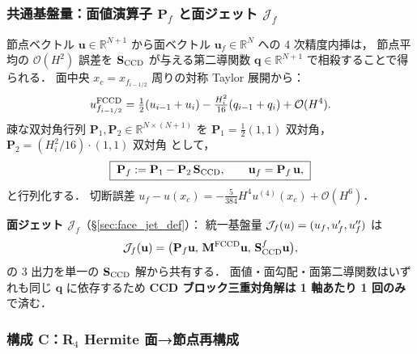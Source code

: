 \subsubsection{\texorpdfstring{共通基盤量：面値演算子 $\mathbf{P}_f$ と面ジェット $\mathcal{J}_f$}{共通基盤量：面値演算子 P\_f と面ジェット J\_f}}
\label{sec:fccd_adv_primitives}

節点ベクトル $\mathbf{u}\in\mathbb{R}^{N+1}$ から面ベクトル
$\mathbf{u}_f\in\mathbb{R}^N$ への 4 次精度内挿は，
節点平均の $\mathcal{O}(H^2)$ 誤差を $\mathbf{S}_{\mathrm{CCD}}$ が与える第二導関数
$\mathbf{q}\in\mathbb{R}^{N+1}$ で相殺することで得られる．
面中央 $x_c = x_{f_{i-1/2}}$ 周りの対称 Taylor 展開から：
\begin{equation}
  u^{\mathrm{FCCD}}_{f_{i-1/2}}
  = \tfrac{1}{2}(u_{i-1}+u_i)
  - \tfrac{H_i^2}{16}(q_{i-1}+q_i)
  + \mathcal{O}(H^4).
  \label{eq:fccd_adv_face_value}
\end{equation}
疎な双対角行列 $\mathbf{P}_1, \mathbf{P}_2\in\mathbb{R}^{N\times(N+1)}$ を
$\mathbf{P}_1 = \tfrac{1}{2}(1,1)\text{ 双対角}$，
$\mathbf{P}_2 = (H_i^2/16)\cdot(1,1)\text{ 双対角}$ として，
\begin{equation}
  \boxed{\;
  \mathbf{P}_f := \mathbf{P}_1 - \mathbf{P}_2\,\mathbf{S}_{\mathrm{CCD}},
  \qquad \mathbf{u}_f = \mathbf{P}_f\,\mathbf{u},
  \;}
  \label{eq:fccd_adv_Pf}
\end{equation}
と行列化する．
切断誤差 $u_f - u(x_c) = -\tfrac{5}{384}H^4 u^{(4)}(x_c) + \mathcal{O}(H^6)$．

\noindent\textbf{面ジェット $\mathcal{J}_f$}（\S\ref{sec:face_jet_def}）：
統一基盤量 $\mathcal{J}_{f}\!\left(u\right) = (u_f, u'_f, u''_f)$ は
\begin{equation}
  \mathcal{J}_f(\mathbf{u}) = \bigl(\mathbf{P}_f\mathbf{u},\,
  \mathbf{M}^{\mathrm{FCCD}}\mathbf{u},\,
  \mathbf{S}_{\mathrm{CCD}}^f\mathbf{u}\bigr),
  \label{eq:fccd_adv_jet}
\end{equation}
の 3 出力を単一の $\mathbf{S}_{\mathrm{CCD}}$ 解から共有する．
面値・面勾配・面第二導関数はいずれも同じ $\mathbf{q}$ に依存するため
\textbf{CCD ブロック三重対角解は 1 軸あたり 1 回のみ}で済む．

\subsubsection{\texorpdfstring{構成 C：R$_4$ Hermite 面→節点再構成}{構成 C：R\_4 Hermite 面→節点再構成}}
\label{sec:fccd_adv_option_c}


